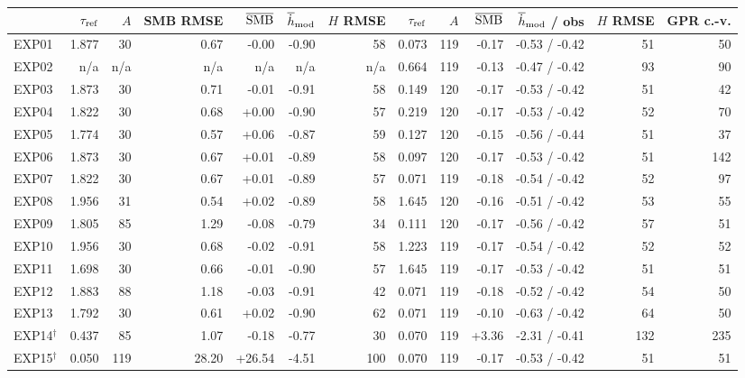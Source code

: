 \begin{tabular}{l|rrrrrr|rrrrrr}
\toprule
 & $\tau_{\rm ref}$ & $A$ & SMB RMSE & $\overline{\rm SMB}$ & $\overline{\dot h}_{\rm mod}$ & $H$ RMSE & $\tau_{\rm ref}$ & $A$ & $\overline{\rm SMB}$ & $\overline{\dot h}_{\rm mod}$ / obs & $H$ RMSE & GPR c.-v. \\
\midrule
EXP01 & 1.877 & 30 & 0.67 & -0.00 & -0.90 & 58 & 0.073 & 119 & -0.17 & -0.53 / -0.42 & 51 & 50 \\
EXP02 & n/a & n/a & n/a & n/a & n/a & n/a & 0.664 & 119 & -0.13 & -0.47 / -0.42 & 93 & 90 \\
EXP03 & 1.873 & 30 & 0.71 & -0.01 & -0.91 & 58 & 0.149 & 120 & -0.17 & -0.53 / -0.42 & 51 & 42 \\
EXP04 & 1.822 & 30 & 0.68 & +0.00 & -0.90 & 57 & 0.219 & 120 & -0.17 & -0.53 / -0.42 & 52 & 70 \\
EXP05 & 1.774 & 30 & 0.57 & +0.06 & -0.87 & 59 & 0.127 & 120 & -0.15 & -0.56 / -0.44 & 51 & 37 \\
EXP06 & 1.873 & 30 & 0.67 & +0.01 & -0.89 & 58 & 0.097 & 120 & -0.17 & -0.53 / -0.42 & 51 & 142 \\
EXP07 & 1.822 & 30 & 0.67 & +0.01 & -0.89 & 57 & 0.071 & 119 & -0.18 & -0.54 / -0.42 & 52 & 97 \\
EXP08 & 1.956 & 31 & 0.54 & +0.02 & -0.89 & 58 & 1.645 & 120 & -0.16 & -0.51 / -0.42 & 53 & 55 \\
EXP09 & 1.805 & 85 & 1.29 & -0.08 & -0.79 & 34 & 0.111 & 120 & -0.17 & -0.56 / -0.42 & 57 & 51 \\
EXP10 & 1.956 & 30 & 0.68 & -0.02 & -0.91 & 58 & 1.223 & 119 & -0.17 & -0.54 / -0.42 & 52 & 52 \\
EXP11 & 1.698 & 30 & 0.66 & -0.01 & -0.90 & 57 & 1.645 & 119 & -0.17 & -0.53 / -0.42 & 51 & 51 \\
EXP12 & 1.883 & 88 & 1.18 & -0.03 & -0.91 & 42 & 0.071 & 119 & -0.18 & -0.52 / -0.42 & 54 & 50 \\
EXP13 & 1.792 & 30 & 0.61 & +0.02 & -0.90 & 62 & 0.071 & 119 & -0.10 & -0.63 / -0.42 & 64 & 50 \\
EXP14$^\dagger$ & 0.437 & 85 & 1.07 & -0.18 & -0.77 & 30 & 0.070 & 119 & +3.36 & -2.31 / -0.41 & 132 & 235 \\
EXP15$^\dagger$ & 0.050 & 119 & 28.20 & +26.54 & -4.51 & 100 & 0.070 & 119 & -0.17 & -0.53 / -0.42 & 51 & 51 \\
\bottomrule
\end{tabular}
